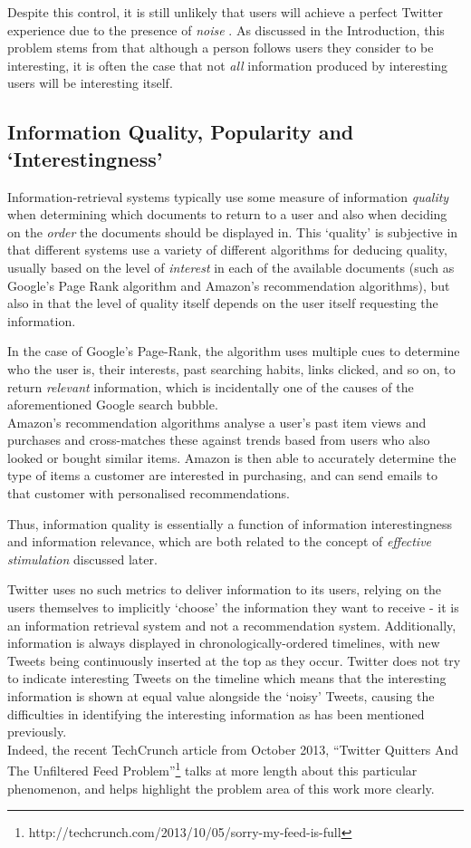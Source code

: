 Despite this control, it is still unlikely that users will achieve a perfect Twitter experience due to the presence of \textit{noise} \cite{alonso10}. As discussed in the Introduction, this problem stems from that although a person follows users they consider to be interesting, it is often the case that not \textit{all} information produced by interesting users will be interesting itself.


\subsection{Information Quality, Popularity and `Interestingness'}
Information-retrieval systems typically use some measure of information \textit{quality} when determining which documents to return to a user and also when deciding on the \textit{order} the documents should be displayed in. This `quality' is subjective in that different systems use a variety of different algorithms for deducing quality, usually based on the level of \textit{interest} in each of the available documents (such as Google's Page Rank algorithm and Amazon's recommendation algorithms), but also in that the level of quality itself depends on the user itself requesting the information. 

In the case of Google's Page-Rank, the algorithm uses multiple cues to determine who the user is, their interests, past searching habits, links clicked, and so on, to return \textit{relevant} information, which is incidentally one of the causes of the aforementioned Google search bubble.\\
Amazon's recommendation algorithms analyse a user's past item views and purchases and cross-matches these against trends based from users who also looked or bought similar items. Amazon is then able to accurately determine the type of items a customer are interested in purchasing, and can send emails to that customer with personalised recommendations.

Thus, information quality is essentially a function of information interestingness and information relevance, which are both related to the concept of \textit{effective stimulation} \cite{xu07} discussed later.

Twitter uses no such metrics to deliver information to its users, relying on the users themselves to implicitly `choose' the information they want to receive - it is an information retrieval system and not a recommendation system. Additionally, information is always displayed in chronologically-ordered timelines, with new Tweets being continuously inserted at the top as they occur. Twitter does not try to indicate interesting Tweets on the timeline which means that the interesting information is shown at equal value alongside the `noisy' Tweets, causing the difficulties in identifying the interesting information as has been mentioned previously.\\
Indeed, the recent TechCrunch article from October 2013, ``Twitter Quitters And The Unfiltered Feed Problem''\footnote{http://techcrunch.com/2013/10/05/sorry-my-feed-is-full} talks at more length about this particular phenomenon, and helps highlight the problem area of this work more clearly.

